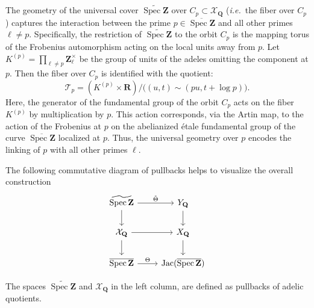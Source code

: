 \documentclass[11pt,a4paper]{article}
\newcommand{\Q}{\mathbf{Q}}
\newcommand{\Z}{\mathbf{Z}}
\newcommand{\R}{\mathbf{R}}
\def\spz{\Spec \Z}
\def\spzb{\overline{\Spec \Z}}
\newcommand{\Spec}{\operatorname{Spec}}
\def\Jac{\operatorname{Jac}}
\def\spz{\Spec \Z}
\def\ie{{\it i.e.\/}\ }
\theoremstyle{plain}
\theoremstyle{definition} %
\begin{document}
  The geometry of the universal cover $\widetilde{\spz}$ over $C_p\subset \mathcal X_\Q$  (\ie the fiber over $C_p$) captures the interaction between the prime $p\in \spzb$ and all other primes $\ell \neq p$.
Specifically, the restriction of $\widetilde{\spz}$ to the orbit $C_p$ is the mapping torus of the Frobenius automorphism acting on the local units away from $p$. Let $
K^{(p)} = \prod_{\ell \neq p} \Z_\ell^\times$
be the group of units of the adeles omitting the component at $p$. Then the fiber over $C_p$ is identified with the quotient:
\[
\mathcal{T}_p = \left(K^{(p)} \times \R\right)/\Big((u, t) \sim (p u, t + \log p)\Big).
\]
Here, the generator of the fundamental group of the orbit $C_p$ acts on the fiber $K^{(p)}$ by multiplication by $p$. This action corresponds, via the Artin map, to the action of the Frobenius at $p$ on the abelianized \'etale fundamental group of the curve $\spzb$ localized at $p$. Thus, the universal geometry over $p$ encodes the linking of $p$ with all other primes $\ell$.

The following commutative diagram of pullbacks helps to visualize the overall construction
\begin{equation}\label{3floora}
\begin{tikzcd}
\widetilde{\spz} \arrow[r,"\tilde\Theta"]\arrow[d] & Y_\Q\arrow[d]
\\
\mathcal{X}_\Q \arrow[r] \arrow[d] & X_\Q \arrow[d] \\
\spzb \arrow[r, "\Theta"] & \Jac(\spzb)
\end{tikzcd}
\end{equation}







The spaces $\widetilde{\spz}$ and $\mathcal{X}_\Q$ in the left column, are  defined as pullbacks of adelic quotients. 
\end{document}
